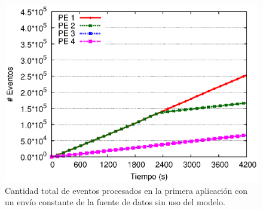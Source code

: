 \begin{figure}[!ht]
	\centering
    \includegraphics[scale=0.7]{images/exp/app1/uniform/sm/eventCount.eps}
    \caption{Cantidad total de eventos procesados en la primera aplicación con un envío constante de la fuente de datos sin uso del modelo.}
    \label{fig:app1-uniform-eventCount-sm}
\end{figure}


